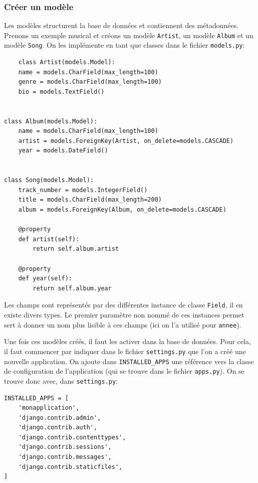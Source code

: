 \documentclass[a4paper, 10pt]{article}
\begin{document}
\subsubsection{Créer un modèle}
Les modèles structurent la base de données et contiennent des métadonnées. Prenons un exemple musical et créons un modèle \texttt{Artist}, un modèle \texttt{Album} et un modèle \texttt{Song}. On les implémente en tant que classes dans le fichier \texttt{models.py}:
\begin{verbatim}
    class Artist(models.Model):
    name = models.CharField(max_length=100)
    genre = models.CharField(max_length=100)
    bio = models.TextField()


class Album(models.Model):
    name = models.CharField(max_length=100)
    artist = models.ForeignKey(Artist, on_delete=models.CASCADE)
    year = models.DateField()


class Song(models.Model):
    track_number = models.IntegerField()
    title = models.CharField(max_length=200)
    album = models.ForeignKey(Album, on_delete=models.CASCADE)

    @property
    def artist(self):
        return self.album.artist

    @property
    def year(self):
        return self.album.year
\end{verbatim}

Les champs sont représentés par des différentes instance de classe \texttt{Field}, il en existe divers types. Le premier paramètre non nommé de ces instances permet sert à donner un nom plus lisible à ces champs (ici on l'a utilisé pour \texttt{annee}).\medskip

Une fois ces modèles créés, il faut les activer dans la base de données. Pour cela, il faut commencer par indiquer dans le fichier \texttt{settings.py} que l'on a créé une nouvelle application. On ajoute dans \texttt{INSTALLED_APPS} une référence vers la classe de configuration de l'application (qui se trouve dans le fichier \texttt{apps.py}). On se trouve donc avec, dans \texttt{settings.py}:

\begin{verbatim}
INSTALLED_APPS = [
    'monapplication',
    'django.contrib.admin',
    'django.contrib.auth',
    'django.contrib.contenttypes',
    'django.contrib.sessions',
    'django.contrib.messages',
    'django.contrib.staticfiles',
]
\end{verbatim}
\end{document}
